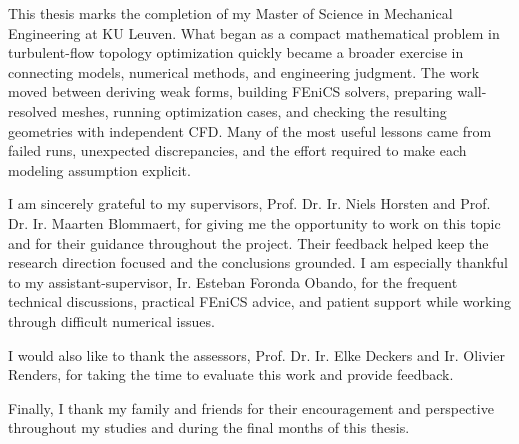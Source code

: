\documentclass[master=ewtk,masteroption=,openany]{kulemt}
\begin{document}
\begin{preface}

This thesis marks the completion of my Master of Science in Mechanical Engineering at KU Leuven. What began as a compact mathematical problem in turbulent-flow topology optimization quickly became a broader exercise in connecting models, numerical methods, and engineering judgment. The work moved between deriving weak forms, building FEniCS solvers, preparing wall-resolved meshes, running optimization cases, and checking the resulting geometries with independent CFD. Many of the most useful lessons came from failed runs, unexpected discrepancies, and the effort required to make each modeling assumption explicit.

I am sincerely grateful to my supervisors, Prof. Dr. Ir. Niels Horsten and Prof. Dr. Ir. Maarten Blommaert, for giving me the opportunity to work on this topic and for their guidance throughout the project. Their feedback helped keep the research direction focused and the conclusions grounded. I am especially thankful to my assistant-supervisor, Ir. Esteban Foronda Obando, for the frequent technical discussions, practical FEniCS advice, and patient support while working through difficult numerical issues.

I would also like to thank the assessors, Prof. Dr. Ir. Elke Deckers and Ir. Olivier Renders, for taking the time to evaluate this work and provide feedback.

Finally, I thank my family and friends for their encouragement and perspective throughout my studies and during the final months of this thesis.

\end{preface}

\tableofcontents*
\end{document}
